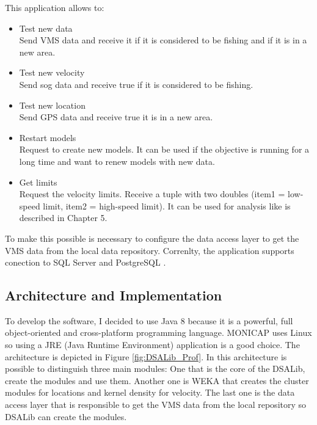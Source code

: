 This application allows to:
\begin{itemize}
\item Test new data \\ Send VMS data and receive it if it is considered to be fishing and if it is in a new area.
\item Test new velocity \\ Send sog data and receive true if it is considered to be fishing.
\item Test new location \\ Send GPS data and receive true it is in a new area.
\item Restart models \\ Request to create new models. It can be used if the objective is running for a long time and want to renew models with new data. 
\item Get limits \\ Request the velocity limits. Receive a tuple with two doubles (item1 = low-speed limit, item2 = high-speed limit). It can be used for analysis like is described in Chapter 5.
\end{itemize}

To make this possible is necessary to configure the data access layer to get the VMS data from the local data repository.
Correnlty, the application supports conection to SQL Server \cite{WEBSITE:SqlServer} and PostgreSQL \cite{WEBSITE:Postgresql}.




\subsection{Architecture and Implementation} %
\label{sub:architecturee_implementation}
To develop the software, I decided to use Java 8 \cite{WEBSITE:OraJava8} because it is a powerful, full object-oriented and cross-platform programming language. MONICAP uses Linux so using a JRE (Java Runtime Environment) application is a good choice.
The architecture is depicted in Figure \ref{fig:DSALib_Prof}. In this architecture is possible to distinguish three main modules: One that is the core of the DSALib, create the modules and use them. Another one is WEKA \cite{WEBSITE:Weka} that creates the cluster modules for locations and kernel density for velocity. The last one is the data access layer that is responsible to get the VMS data from the local repository so DSALib can create the modules.


